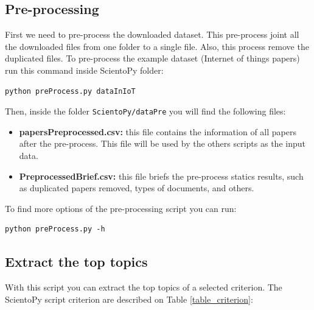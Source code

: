\documentclass[10pt,letterpaper]{article}
\begin{document}
\subsection{Pre-processing}

First we need to pre-process the downloaded dataset. This pre-process joint all the downloaded files from one folder to a single file. Also, this process remove the duplicated files. To pre-process the example dataset (Internet of things papers) run this command inside ScientoPy folder: 
\begin{verbatim}
python preProcess.py dataInIoT
\end{verbatim}

Then, inside the folder \verb|ScientoPy/dataPre| you will find the following files: 
\begin{itemize}
\item \textbf{papersPreprocessed.csv:} this file contains the information of all papers after the pre-process. This file will be used by the others scripts as the input data. 
\item \textbf{PreprocessedBrief.csv:} this file briefs the pre-process statics results, such as duplicated papers removed, types of documents, and others. 
\end{itemize}

To find more options of the pre-processing script you can run:
\begin{verbatim}
python preProcess.py -h
\end{verbatim}

\subsection{Extract the top topics}

With this script you can extract the top topics of a selected criterion. The ScientoPy script criterion are described on Table \ref{table_criterion}:
\end{document}
